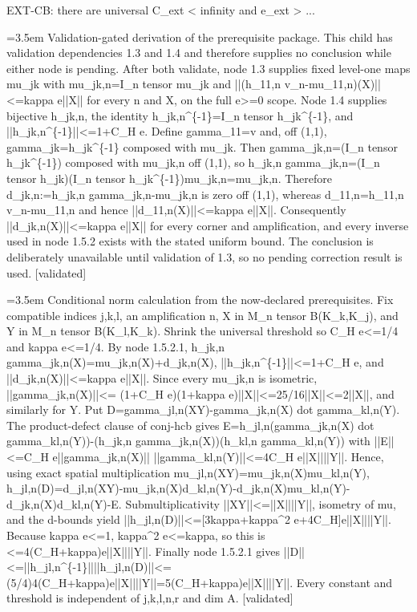 \documentclass{article}
\newcommand{\step}[1]{\par\noindent\hangindent=3.5em\hangafter=1%
  \makebox[3.5em][l]{\textbf{#1.}}}
\newcommand{\steptag}[1]{\hfill{\small\textsf{[#1]}}}
\begin{document}
\begin{proofbox}{EXT-CB: there are universal C\_ext < infinity and e\_ext > ...}
\step{1.5.2.1.1} Validation-gated derivation of the prerequisite package. This child has validation dependencies 1.3 and 1.4 and therefore supplies no conclusion while either node is pending. After both validate, node 1.3 supplies fixed level-one maps mu\_jk with mu\_jk,n=I\_n tensor mu\_jk and ||(h\_11,n v\_n-mu\_11,n)(X)||<=kappa e||X|| for every n and X, on the full e>=0 scope. Node 1.4 supplies bijective h\_jk,n, the identity h\_jk,n\textasciicircum{}\{-1\}=I\_n tensor h\_jk\textasciicircum{}\{-1\}, and ||h\_jk,n\textasciicircum{}\{-1\}||<=1+C\_H e. Define gamma\_11=v and, off (1,1), gamma\_jk=h\_jk\textasciicircum{}\{-1\} composed with mu\_jk. Then gamma\_jk,n=(I\_n tensor h\_jk\textasciicircum{}\{-1\}) composed with mu\_jk,n off (1,1), so h\_jk,n gamma\_jk,n=(I\_n tensor h\_jk)(I\_n tensor h\_jk\textasciicircum{}\{-1\})mu\_jk,n=mu\_jk,n. Therefore d\_jk,n:=h\_jk,n gamma\_jk,n-mu\_jk,n is zero off (1,1), whereas d\_11,n=h\_11,n v\_n-mu\_11,n and hence ||d\_11,n(X)||<=kappa e||X||. Consequently ||d\_jk,n(X)||<=kappa e||X|| for every corner and amplification, and every inverse used in node 1.5.2 exists with the stated uniform bound. The conclusion is deliberately unavailable until validation of 1.3, so no pending correction result is used. \steptag{validated} \\[4pt]
\step{1.5.2.2} Conditional norm calculation from the now-declared prerequisites. Fix compatible indices j,k,l, an amplification n, X in M\_n tensor B(K\_k,K\_j), and Y in M\_n tensor B(K\_l,K\_k). Shrink the universal threshold so C\_H e<=1/4 and kappa e<=1/4. By node 1.5.2.1, h\_jk,n gamma\_jk,n(X)=mu\_jk,n(X)+d\_jk,n(X), ||h\_jk,n\textasciicircum{}\{-1\}||<=1+C\_H e, and ||d\_jk,n(X)||<=kappa e||X||. Since every mu\_jk,n is isometric, ||gamma\_jk,n(X)||<= (1+C\_H e)(1+kappa e)||X||<=25/16||X||<=2||X||, and similarly for Y. Put D=gamma\_jl,n(XY)-gamma\_jk,n(X) dot gamma\_kl,n(Y). The product-defect clause of conj-hcb gives E=h\_jl,n(gamma\_jk,n(X) dot gamma\_kl,n(Y))-(h\_jk,n gamma\_jk,n(X))(h\_kl,n gamma\_kl,n(Y)) with ||E||<=C\_H e||gamma\_jk,n(X)|| ||gamma\_kl,n(Y)||<=4C\_H e||X||||Y||. Hence, using exact spatial multiplication mu\_jl,n(XY)=mu\_jk,n(X)mu\_kl,n(Y), h\_jl,n(D)=d\_jl,n(XY)-mu\_jk,n(X)d\_kl,n(Y)-d\_jk,n(X)mu\_kl,n(Y)-d\_jk,n(X)d\_kl,n(Y)-E. Submultiplicativity ||XY||<=||X||||Y||, isometry of mu, and the d-bounds yield ||h\_jl,n(D)||<=[3kappa+kappa\textasciicircum{}2 e+4C\_H]e||X||||Y||. Because kappa e<=1, kappa\textasciicircum{}2 e<=kappa, so this is <=4(C\_H+kappa)e||X||||Y||. Finally node 1.5.2.1 gives ||D||<=||h\_jl,n\textasciicircum{}\{-1\}||||h\_jl,n(D)||<=(5/4)4(C\_H+kappa)e||X||||Y||=5(C\_H+kappa)e||X||||Y||. Every constant and threshold is independent of j,k,l,n,r and dim A. \steptag{validated} \\[6pt]

\end{proofbox}
\end{document}
